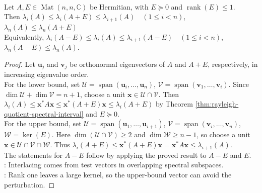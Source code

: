 \begin{theorem} \label{thm:rank-one-psd-eigenvalue-interlacing} \\
Let $A,E\in\operatorname{Mat}(n,n,\mathbb{C})$ be Hermitian, with $E\succeq0$ and $\operatorname{rank}(E)\leq1$.\\
Then $\lambda_i(A)\leq\lambda_i(A+E)\leq\lambda_{i+1}(A)\quad(1\leq i<n)$, $\lambda_n(A)\leq\lambda_n(A+E)$\\
Equivalently, $\lambda_i(A-E)\leq\lambda_i(A)\leq\lambda_{i+1}(A-E)\quad(1\leq i<n)$, $\lambda_n(A-E)\leq\lambda_n(A)$.
\begin{proof}
Let $\mathbf{u}_j$ and $\mathbf{v}_j$ be orthonormal eigenvectors of $A$ and $A+E$, respectively, in increasing eigenvalue order.\\
For the lower bound, set $\mathcal{U}=\operatorname{span}(\mathbf{u}_i,\ldots,\mathbf{u}_n)$, $\mathcal{V}=\operatorname{span}(\mathbf{v}_1,\ldots,\mathbf{v}_i)$. Since $\dim\mathcal{U}+\dim\mathcal{V}=n+1$, choose a unit $\mathbf{x}\in\mathcal{U}\cap\mathcal{V}$. Then $\lambda_i(A)\leq \mathbf{x}^*A\mathbf{x}\leq \mathbf{x}^*(A+E)\mathbf{x}\leq\lambda_i(A+E)$ by Theorem \ref{thm:rayleigh-quotient-spectral-interval} and $E\succeq0$.\\
For the upper bound, set $\mathcal{U}=\operatorname{span}(\mathbf{u}_1,\ldots,\mathbf{u}_{i+1})$, $\mathcal{V}=\operatorname{span}(\mathbf{v}_i,\ldots,\mathbf{v}_n)$, $\mathcal{W}=\ker(E)$. Here $\dim(\mathcal{U}\cap\mathcal{V})\geq2$ and $\dim\mathcal{W}\geq n-1$, so choose a unit $\mathbf{x}\in\mathcal{U}\cap\mathcal{V}\cap\mathcal{W}$. Thus $\lambda_i(A+E)\leq \mathbf{x}^*(A+E)\mathbf{x} =\mathbf{x}^*A\mathbf{x} \leq \lambda_{i+1}(A)$.\\
The statements for $A-E$ follow by applying the proved result to $A-E$ and $E$.\\
: Interlacing comes from test vectors in overlapping spectral subspaces.\\
: Rank one leaves a large kernel, so the upper-bound vector can avoid the perturbation.
\end{proof}
\end{theorem}

